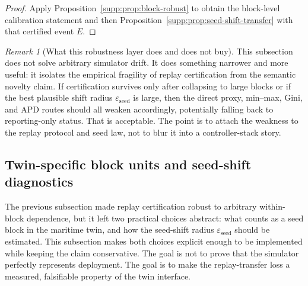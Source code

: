 \documentclass[11pt]{article}
\newcommand{\1}{\mathbf{1}}
\theoremstyle{definition}
\theoremstyle{plain}
\theoremstyle{remark}
\newtheorem{remark}[definition]{Remark}
\begin{document}
\begin{proof}
Apply Proposition~\ref{supp:prop:block-robust} to obtain the block-level calibration statement and then Proposition~\ref{supp:prop:seed-shift-transfer} with that certified event $E$.
\end{proof}

\begin{remark}[What this robustness layer does and does not buy]
\label{supp:rem:seed-shift-caution}
This subsection does not solve arbitrary simulator drift. It does something narrower and more useful: it isolates the empirical fragility of replay certification from the semantic novelty claim. If certification survives only after collapsing to large blocks or if the best plausible shift radius $\varepsilon_{\mathrm{seed}}$ is large, then the direct proxy, min--max, Gini, and APD routes should all weaken accordingly, potentially falling back to reporting-only status. That is acceptable. The point is to attach the weakness to the replay protocol and seed law, not to blur it into a controller-stack story.
\end{remark}


\subsection{Twin-specific block units and seed-shift diagnostics}
\label{supp:subsec:twin-specific-shift}

The previous subsection made replay certification robust to arbitrary within-block dependence, but it left two practical choices abstract: what counts as a seed block in the maritime twin, and how the seed-shift radius $\varepsilon_{\mathrm{seed}}$ should be estimated. This subsection makes both choices explicit enough to be implemented while keeping the claim conservative. The goal is not to prove that the simulator perfectly represents deployment. The goal is to make the replay-transfer loss a measured, falsifiable property of the twin interface.
\end{document}
